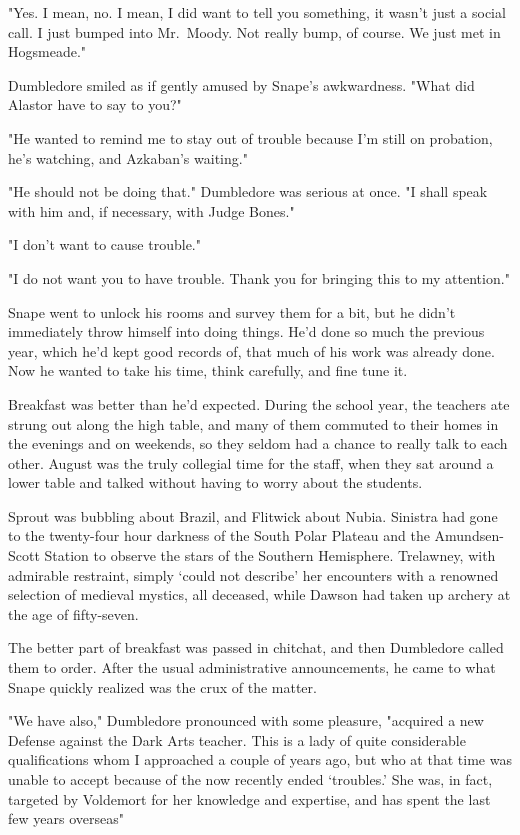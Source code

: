 "Yes. I mean, no. I mean, I did want to tell you something, it wasn't just a social call. I just bumped into Mr.~Moody. Not really bump, of course. We just met in Hogsmeade."

Dumbledore smiled as if gently amused by Snape's awkwardness. "What did Alastor have to say to you?"

"He wanted to remind me to stay out of trouble because I'm still on probation, he's watching, and Azkaban's waiting."

"He should not be doing that." Dumbledore was serious at once. "I shall speak with him and, if necessary, with Judge Bones."

"I don't want to cause trouble."

"I do not want you to have trouble. Thank you for bringing this to my attention."

Snape went to unlock his rooms and survey them for a bit, but he didn't immediately throw himself into doing things. He'd done so much the previous year, which he'd kept good records of, that much of his work was already done. Now he wanted to take his time, think carefully, and fine tune it.

Breakfast was better than he'd expected. During the school year, the teachers ate strung out along the high table, and many of them commuted to their homes in the evenings and on weekends, so they seldom had a chance to really talk to each other. August was the truly collegial time for the staff, when they sat around a lower table and talked without having to worry about the students.

Sprout was bubbling about Brazil, and Flitwick about Nubia. Sinistra had gone to the twenty-four hour darkness of the South Polar Plateau and the Amundsen-Scott Station to observe the stars of the Southern Hemisphere. Trelawney, with admirable restraint, simply `could not describe' her encounters with a renowned selection of medieval mystics, all deceased, while Dawson had taken up archery at the age of fifty-seven.

The better part of breakfast was passed in chitchat, and then Dumbledore called them to order. After the usual administrative announcements, he came to what Snape quickly realized was the crux of the matter.

"We have also," Dumbledore pronounced with some pleasure, "acquired a new Defense against the Dark Arts teacher. This is a lady of quite considerable qualifications whom I approached a couple of years ago, but who at that time was unable to accept because of the now recently ended `troubles.' She was, in fact, targeted by Voldemort for her knowledge and expertise, and has spent the last few years overseas{\el}"

